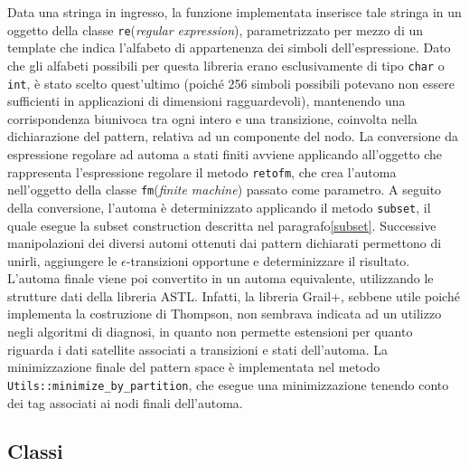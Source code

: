 Data una stringa in ingresso, la funzione implementata inserisce tale stringa in un oggetto della classe \verb|re|(\emph{regular expression}), parametrizzato per mezzo di un template che indica l'alfabeto di appartenenza dei simboli dell'espressione. 
Dato che gli alfabeti possibili per questa libreria erano esclusivamente di tipo \verb|char| o \verb|int|, è stato scelto quest'ultimo (poiché 256 simboli possibili potevano non essere sufficienti in applicazioni di dimensioni ragguardevoli), mantenendo una corrispondenza biunivoca tra ogni intero e una transizione, coinvolta nella dichiarazione del pattern, relativa ad un componente del nodo. La conversione da espressione regolare ad automa a stati finiti avviene applicando all'oggetto che rappresenta l'espressione regolare il metodo \verb|retofm|, che crea l'automa nell'oggetto della classe \verb|fm|(\emph{finite machine}) passato come parametro. A seguito della conversione, l'automa è determinizzato applicando il metodo \verb|subset|, il quale esegue la subset construction descritta nel paragrafo\ref{subset}.
Successive manipolazioni dei diversi automi ottenuti dai pattern dichiarati permettono di unirli, aggiungere le $\epsilon$-transizioni opportune e determinizzare il risultato. L'automa finale viene poi convertito in un automa equivalente, utilizzando le strutture dati della libreria ASTL. Infatti, la libreria Grail+, sebbene utile poiché implementa la costruzione di Thompson, non sembrava indicata ad un utilizzo negli algoritmi di diagnosi, in quanto non permette estensioni per quanto riguarda i dati satellite associati a transizioni e stati dell'automa.
La minimizzazione finale del pattern space è implementata nel metodo \verb|Utils::minimize_by_partition|, che esegue una minimizzazione tenendo conto dei tag associati ai nodi finali dell'automa.

\subsection{Classi}


